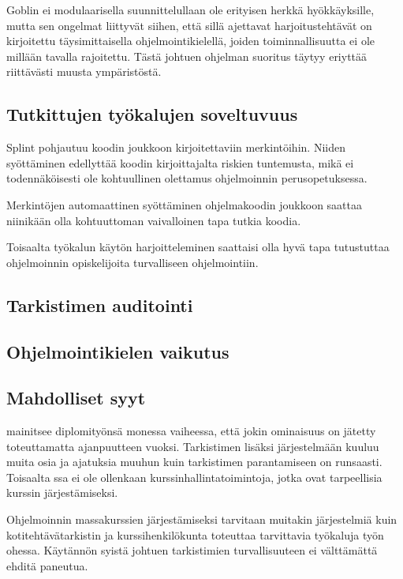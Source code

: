 Goblin ei modulaarisella suunnittelullaan ole erityisen herkkä hyökkäyksille,
mutta sen ongelmat liittyvät siihen, että sillä ajettavat harjoitustehtävät on
kirjoitettu täysimittaisella ohjelmointikielellä, joiden toiminnallisuutta ei
ole millään tavalla rajoitettu. Tästä johtuen ohjelman suoritus täytyy eriyttää
riittävästi muusta ympäristöstä.

\subsection{Tutkittujen työkalujen soveltuvuus}

Splint pohjautuu koodin joukkoon kirjoitettaviin merkintöihin. Niiden
syöttäminen edellyttää koodin kirjoittajalta riskien tuntemusta, mikä ei
todennäköisesti ole kohtuullinen olettamus ohjelmoinnin perusopetuksessa.

Merkintöjen automaattinen syöttäminen ohjelmakoodin joukkoon saattaa niinikään
olla kohtuuttoman vaivalloinen tapa tutkia koodia.

Toisaalta työkalun käytön harjoitteleminen saattaisi olla hyvä tapa tutustuttaa
ohjelmoinnin opiskelijoita turvalliseen ohjelmointiin.

\subsection{Tarkistimen auditointi}

\subsection{Ohjelmointikielen vaikutus}


\subsection{Mahdolliset syyt}

\citet{Hiisilä} mainitsee diplomityönsä monessa vaiheessa, että jokin
ominaisuus on jätetty toteuttamatta ajanpuutteen vuoksi. Tarkistimen lisäksi
järjestelmään kuuluu muita osia ja ajatuksia muuhun kuin tarkistimen
parantamiseen on runsaasti. Toisaalta {\scmrobo}ssa ei ole ollenkaan
kurssinhallintatoimintoja, jotka ovat tarpeellisia kurssin järjestämiseksi.

Ohjelmoinnin massakurssien järjestämiseksi tarvitaan muitakin järjestelmiä
kuin kotitehtävätarkistin ja kurssihenkilökunta toteuttaa tarvittavia
työkaluja työn ohessa. Käytännön syistä johtuen tarkistimien turvallisuuteen
ei välttämättä ehditä paneutua.

